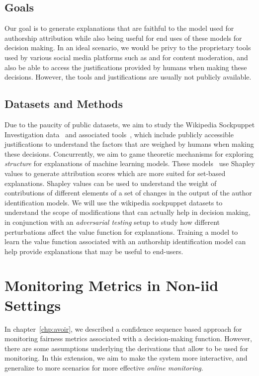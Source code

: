 \subsection{Goals}
Our goal is to generate explanations that are faithful to the model used for authorship attribution while also being useful for end uses of these models for decision making.
In an ideal scenario, we would be privy to the proprietary tools used by various social media platforms such as \citet{reddit2020banevasion} and \citet{twitch2021banevasion} for content moderation, and also be able to access the justifications provided by humans when making these decisions.
However, the tools and justifications are usually not publicly available.

\subsection{Datasets and Methods}

Due to the paucity of public datasets, we aim to study the Wikipedia Sockpuppet Investigation data~\cite{wiki2008SPI} and associated tools~\cite{smith2020wikipediaSPItools}, which  include publicly accessible justifications to understand the factors that are weighed by humans when making these decisions.
Concurrently, we aim to game theoretic mechanisms for exploring \textit{structure} for explanations of machine learning models.
These models~\cite{datta2016algorithmic,lundberg2017unified,sundararajan2020many,yan2021if} use Shapley values to generate attribution scores which are more suited for set-based explanations.
Shapley values can be used to understand the weight of contributions of different elements of a set of changes in the output of the author identification models. 
We will use the wikipedia sockpuppet datasets to understand the scope of modifications that can actually help in decision making, in conjunction with an \textit{adversarial testing} setup to study how different perturbations affect the value function for explanations.
Training a model to learn the value function associated with an authorship identification model can help provide explanations that may be useful to end-users.

\section{Monitoring Metrics in Non-iid Settings}
\label{sec:future_work:monitoring}

In chapter~\ref{chp:avoir},  we described a confidence sequence based approach for monitoring fairness metrics associated with a decision-making function.
However, there are some assumptions underlying the derivations that allow \AVOIRmethodname{} to be used for monitoring.
In this extension, we aim to make the \AVOIRmethodname{} system more interactive, and generalize to more scenarios for more effective \textit{online monitoring}.

